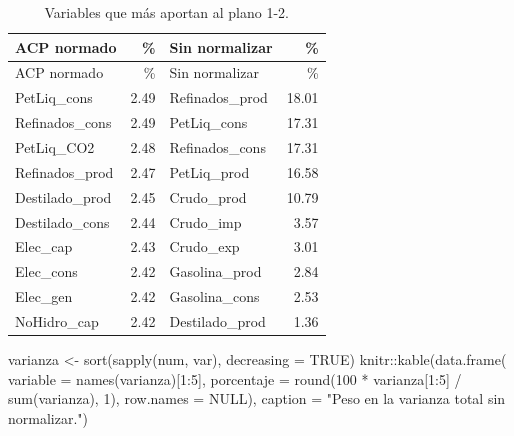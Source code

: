 \documentclass[oneside, openany, fontset=libertinus]{mitthesis}
\newenvironment{Shaded}{\begin{snugshade}}{\end{snugshade}}
\newcommand{\AttributeTok}[1]{\textcolor[rgb]{0.40,0.45,0.13}{#1}}
\newcommand{\ConstantTok}[1]{\textcolor[rgb]{0.56,0.35,0.01}{#1}}
\newcommand{\DecValTok}[1]{\textcolor[rgb]{0.68,0.00,0.00}{#1}}
\newcommand{\FunctionTok}[1]{\textcolor[rgb]{0.28,0.35,0.67}{#1}}
\newcommand{\NormalTok}[1]{\textcolor[rgb]{0.00,0.23,0.31}{#1}}
\newcommand{\OtherTok}[1]{\textcolor[rgb]{0.00,0.23,0.31}{#1}}
\newcommand{\SpecialCharTok}[1]{\textcolor[rgb]{0.37,0.37,0.37}{#1}}
\newcommand{\StringTok}[1]{\textcolor[rgb]{0.13,0.47,0.30}{#1}}
\begin{document}
\begin{longtable}[]{@{}lrlr@{}}
\caption{Variables que más aportan al plano 1-2.}\tabularnewline
\toprule\noalign{}
ACP normado & \% & Sin normalizar & \% \\
\midrule\noalign{}
\endfirsthead
\toprule\noalign{}
ACP normado & \% & Sin normalizar & \% \\
\midrule\noalign{}
\endhead
\bottomrule\noalign{}
\endlastfoot
PetLiq\_cons & 2.49 & Refinados\_prod & 18.01 \\
Refinados\_cons & 2.49 & PetLiq\_cons & 17.31 \\
PetLiq\_CO2 & 2.48 & Refinados\_cons & 17.31 \\
Refinados\_prod & 2.47 & PetLiq\_prod & 16.58 \\
Destilado\_prod & 2.45 & Crudo\_prod & 10.79 \\
Destilado\_cons & 2.44 & Crudo\_imp & 3.57 \\
Elec\_cap & 2.43 & Crudo\_exp & 3.01 \\
Elec\_cons & 2.42 & Gasolina\_prod & 2.84 \\
Elec\_gen & 2.42 & Gasolina\_cons & 2.53 \\
NoHidro\_cap & 2.42 & Destilado\_prod & 1.36 \\
\end{longtable}

\Needspace{3.23in}

\begin{Shaded}
\begin{Highlighting}[]
\NormalTok{varianza }\OtherTok{\textless{}{-}} \FunctionTok{sort}\NormalTok{(}\FunctionTok{sapply}\NormalTok{(num, var), }\AttributeTok{decreasing =} \ConstantTok{TRUE}\NormalTok{)}
\NormalTok{knitr}\SpecialCharTok{::}\FunctionTok{kable}\NormalTok{(}\FunctionTok{data.frame}\NormalTok{(}
  \AttributeTok{variable =} \FunctionTok{names}\NormalTok{(varianza)[}\DecValTok{1}\SpecialCharTok{:}\DecValTok{5}\NormalTok{],}
  \AttributeTok{porcentaje =} \FunctionTok{round}\NormalTok{(}\DecValTok{100} \SpecialCharTok{*}\NormalTok{ varianza[}\DecValTok{1}\SpecialCharTok{:}\DecValTok{5}\NormalTok{] }\SpecialCharTok{/} \FunctionTok{sum}\NormalTok{(varianza), }\DecValTok{1}\NormalTok{),}
  \AttributeTok{row.names =} \ConstantTok{NULL}\NormalTok{),}
  \AttributeTok{caption =} \StringTok{"Peso en la varianza total sin normalizar."}\NormalTok{)}
\end{Highlighting}
\end{Shaded}

\Needspace{2.12in}
\end{document}
